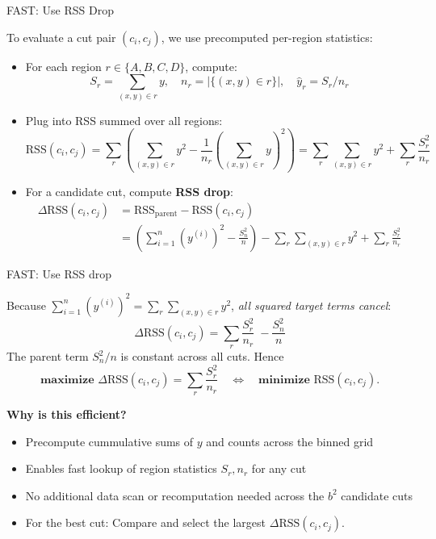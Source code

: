 \documentclass[11pt,compress,t,notes=noshow, aspectratio=169, xcolor=table]{beamer}
\begin{document}
\begin{frame}{FAST: Use RSS Drop}
\small

To evaluate a cut pair $(c_i, c_j)$, we use precomputed per-region statistics:

\begin{itemize}
  \item For each region $r \in \{A, B, C, D\}$, compute:
    \[
    S_r = \sum_{(x,y)\in r} y,\quad
    n_r = |\{(x,y)\in r\}|,\quad
    \hat y_r = S_r / n_r
    \]
  \item Plug into RSS summed over all regions: $$
\text{RSS}(c_i, c_j) = \sum_{r} \left( \sum_{(x,y) \in r} y^2 - \frac{1}{n_r} \left(\sum_{(x,y) \in r} y \right)^2 \right) = 
\sum_{r}\sum_{(x,y)\in r} y^2+\sum_{r}\frac{S_r^{2}}{n_r}
$$
  \item 
For a candidate cut, compute \textbf{RSS drop}:
\begin{align*}
  \Delta\text{RSS}(c_i,c_j)
     &=\text{RSS}_{\text{parent}}-\text{RSS}(c_i,c_j)\\
     &=\left(\sum_{i = 1}^n \left(y^{(i)}\right)^{2} -\frac{S_n^{2}}{n}\right)
       -  \sum_{r}\sum_{(x,y)\in r} y^2+\sum_{r}\frac{S_r^{2}}{n_r}
\end{align*}
\end{itemize}


\end{frame}
\begin{frame}{FAST: Use RSS drop}

Because $\sum_{i = 1}^n \left(y^{(i)}\right) ^{2} = \sum_{r}\sum_{(x,y)\in r} y^2$, \emph{all squared target terms cancel}:
\[
  \boxed{\displaystyle
  \Delta\text{RSS}(c_i,c_j)
     =\sum_{r}\frac{S_r^{2}}{n_r}\;-
      \frac{S_n^{2}}{n}}
\]
The parent term $S_n^{2}/n$ is constant across all cuts.  Hence
\[
  \textbf{maximize }\Delta\text{RSS}(c_i,c_j)=\sum_{r}\frac{S_r^{2}}{n_r}
  \quad\Longleftrightarrow\quad
  \textbf{minimize }\text{RSS}(c_i,c_j).
\]


\textbf{Why is this efficient?}
\begin{itemize}
  \item Precompute cummulative sums of \(y\) and counts across the binned grid
  \item Enables fast lookup of region statistics \(S_r, n_r\) for any cut
  \item No additional data scan or recomputation needed across the \(b^2\) candidate cuts
  \item For the best cut: Compare and select the largest
$\Delta\text{RSS}(c_i,c_j)$.
\end{itemize}


\end{frame}
\end{document}
